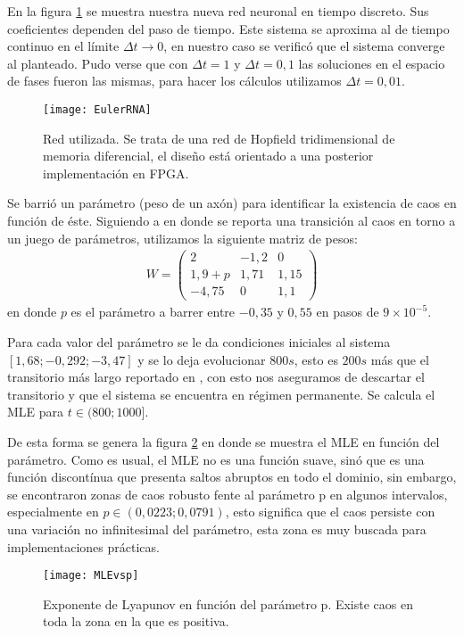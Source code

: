 En la figura \ref{fig:EulerRNA} se muestra nuestra nueva red neuronal en tiempo discreto.
Sus coeficientes dependen del paso de tiempo.
Este sistema se aproxima al de tiempo continuo en el límite $\Delta t \rightarrow 0$, en nuestro caso se verificó que el sistema converge al planteado.
Pudo verse que con $\Delta t = 1$ y $\Delta t = 0,1$ las soluciones en el espacio de fases fueron las mismas, para hacer los cálculos utilizamos $\Delta t = 0,01$.
%
\begin{figure}
	\centering
	\texttt{[image: EulerRNA]}\\
	\caption{Red utilizada. Se trata de una red de Hopfield tridimensional de memoria diferencial, el diseño está orientado a una posterior implementación en FPGA.}\label{fig:EulerRNA}
\end{figure}

Se barrió un parámetro (peso de un axón) para identificar la existencia de caos en función de éste.
Siguiendo a \cite{Yang2003} en donde se reporta una transición al caos en torno a un juego de parámetros, utilizamos la siguiente matriz de pesos:
%
\begin{eqnarray}\label{eq:matrizW}
W =
\left( \begin{array}{ccc}
2 & -1,2 & 0\\
1,9+p & 1,71 & 1,15\\
-4,75 & 0 &1,1
\end{array} \right)
\end{eqnarray}
%
en donde $p$ es el parámetro a barrer entre $-0,35$ y $0,55$ en pasos de $9\times 10^{-5}$.

Para cada valor del parámetro se le da condiciones iniciales al sistema $[1,68; -0,292; -3,47]$ y se lo deja evolucionar $800s$, esto es $200s$ más que el transitorio más largo reportado en \cite{Yang2003}, con esto nos aseguramos de descartar el transitorio y que el sistema se encuentra en régimen permanente.
Se calcula el MLE para $t \in (800;1000]$.

De esta forma se genera la figura \ref{fig:MLEvsp} en donde se muestra el MLE en función del parámetro.
Como es usual, el MLE no es una función suave, sinó que es una función discontínua que presenta saltos abruptos en todo el dominio, sin embargo, se encontraron zonas de caos robusto fente al parámetro p en algunos intervalos, especialmente en $p \in (0,0223; 0,0791)$, esto significa que el caos persiste con una variación no infinitesimal del parámetro, esta zona es muy buscada para implementaciones prácticas.
\begin{figure}
	\centering
	\texttt{[image: MLEvsp]}\\
	\caption{Exponente de Lyapunov en función del parámetro p. Existe caos en toda la zona en la que es positiva.}\label{fig:MLEvsp}
\end{figure}

